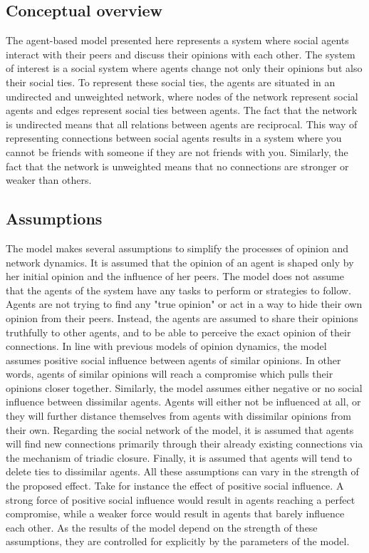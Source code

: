 \documentclass[11pt]{article}
\begin{document}
\subsection{Conceptual overview}
The agent-based model presented here represents a system where social agents interact with their peers and discuss their opinions with each other. The system of interest is a social system where agents change not only their opinions but also their social ties. To represent these social ties, the agents are situated in an undirected and unweighted network, where nodes of the network represent social agents and edges represent social ties between agents. The fact that the network is undirected means that all relations between agents are reciprocal. This way of representing connections between social agents results in a system where you cannot be friends with someone if they are not friends with you. Similarly, the fact that the network is unweighted means that no connections are stronger or weaker than others. 


\subsection{Assumptions}
The model makes several assumptions to simplify the processes of opinion and network dynamics. It is assumed that the opinion of an agent is shaped only by her initial opinion and the influence of her peers. 
The model does not assume that the agents of the system have any tasks to perform or strategies to follow. Agents are not trying to find any "true opinion" or act in a way to hide their own opinion from their peers. Instead, the agents are assumed to share their opinions truthfully to other agents, and to be able to perceive the exact opinion of their connections. 
In line with previous models of opinion dynamics, the model assumes positive social influence between agents of similar opinions. In other words, agents of similar opinions will reach a compromise which pulls their opinions closer together. Similarly, the model assumes either negative or no social influence between dissimilar agents. Agents will either not be influenced at all, or they will further distance themselves from agents with dissimilar opinions from their own. Regarding the social network of the model, it is assumed that agents will find new connections primarily through their already existing connections via the mechanism of triadic closure. Finally, it is assumed that agents will tend to delete ties to dissimilar agents.
All these assumptions can vary in the strength of the proposed effect. Take for instance the effect of positive social influence. A strong force of positive social influence would result in agents reaching a perfect compromise, while a weaker force would result in agents that barely influence each other. 
As the results of the model depend on the strength of these assumptions, they are controlled for explicitly by the parameters of the model. 
\end{document}
